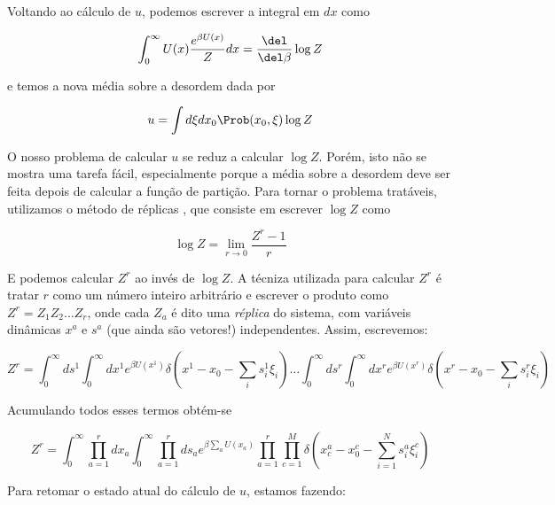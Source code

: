 Voltando ao cálculo de $u$, podemos escrever a integral em $dx$ como

  \begin{equation}
    \label{eq:21}
    \int_0^\infty U(x) \frac{e^{\beta U(x)}}{Z} dx = \frac{\del}{\del \beta} \log Z
  \end{equation}

  e temos a nova média sobre a desordem dada por

  \begin{equation}
    \label{eq:20}
    u = \int d\xi dx_0 \Prob(x_0, \xi) \log Z
  \end{equation}


  O nosso problema de calcular $u$ se reduz a calcular $\log
  Z$. Porém, isto não se mostra uma tarefa fácil, especialmente porque
  a média sobre a desordem deve ser feita depois de calcular a função
  de partição. Para tornar o problema tratáveis, utilizamos o método
  de réplicas \cite{NishimoriBook}, que consiste em escrever $\log Z$
  como

  \begin{equation}
    \label{eq:11}
    \log Z = \lim_{r\to 0} \frac{Z^r - 1}{r}
  \end{equation}
  
  E podemos calcular $Z^r$ ao invés de $\log Z$. A técniza utilizada
  para calcular $Z^r$ é tratar $r$ como um número inteiro arbitrário e
  escrever o produto como $Z^r = Z_1 Z_2 \ldots Z_r$, onde cada $Z_a$
  é dito uma \emph{réplica} do sistema, com variáveis dinâmicas $x^a$
  e $s^a$ (que ainda são vetores!) independentes. Assim, escrevemos:

  \begin{equation}
    \label{eq:23}
    Z^r = \int_0^\infty ds^1 \int_0^\infty dx^1 e^{\beta U(x^1)}
    \delta\left(x^1 - x_0 - \sum_i s^1_i \xi_i \right) \ldots \int_0^\infty ds^r \int_0^\infty dx^r e^{\beta U(x^r)}
    \delta\left(x^r - x_0 - \sum_i s^r_i \xi_i \right)
  \end{equation}

Acumulando todos esses termos obtém-se

  \begin{equation}
    \label{eq:22}
    Z^r = \int_0^\infty \prod_{a=1}^r d x_a \int_0^\infty
    \prod_{a=1}^r d s_a e^{\beta \sum_a U(x_a)} \prod_{a=1}^r
    \prod_{c=1}^M \delta \left( x_c^a - x_0^c - \sum_{i=1}^N s_i^a \xi_i^c\right)
  \end{equation}

  Para retomar o estado atual do cálculo de $u$, estamos fazendo:

